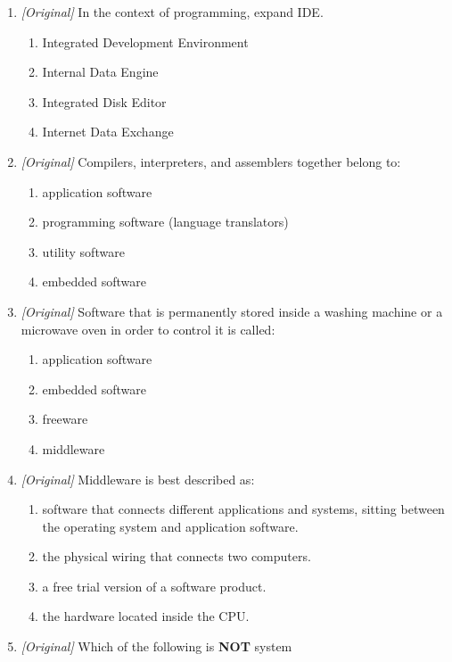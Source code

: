 \begin{enumerate}[label=\textbf{Q\arabic*.}, leftmargin=*]
\begin{enumerate}[label=\Alph*.]
    \item MS PowerPoint
    \item A compiler
  \end{enumerate}
\item \textit{[Original]} In the context of programming, expand IDE.
  \begin{enumerate}[label=\Alph*.]
    \item Integrated Development Environment
    \item Internal Data Engine
    \item Integrated Disk Editor
    \item Internet Data Exchange
  \end{enumerate}
\item \textit{[Original]} Compilers, interpreters, and assemblers together
  belong to:
  \begin{enumerate}[label=\Alph*.]
    \item application software
    \item programming software (language translators)
    \item utility software
    \item embedded software
  \end{enumerate}
\item \textit{[Original]} Software that is permanently stored inside a washing
  machine or a microwave oven in order to control it is called:
  \begin{enumerate}[label=\Alph*.]
    \item application software
    \item embedded software
    \item freeware
    \item middleware
  \end{enumerate}
\item \textit{[Original]} Middleware is best described as:
  \begin{enumerate}[label=\Alph*.]
    \item software that connects different applications and systems, sitting
      between the operating system and application software.
    \item the physical wiring that connects two computers.
    \item a free trial version of a software product.
    \item the hardware located inside the CPU.
  \end{enumerate}
\item \textit{[Original]} Which of the following is \textbf{NOT} system

\end{enumerate}

